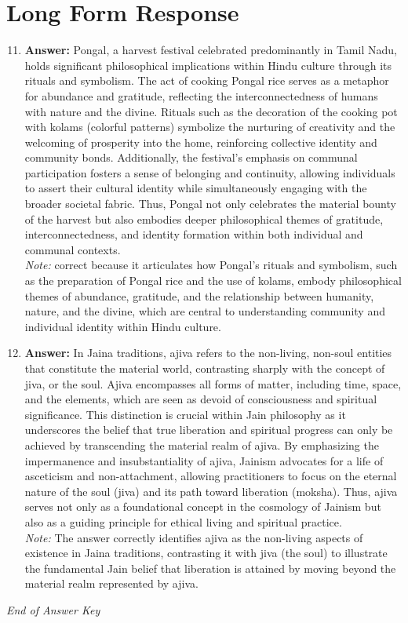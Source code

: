 \documentclass[12pt]{article}
\begin{document}
\section*{Long Form Response}
\begin{enumerate}[label=\arabic*.]
\setcounter{enumi}{10}
\item \textbf{Answer:} Pongal, a harvest festival celebrated predominantly in Tamil Nadu, holds significant philosophical implications within Hindu culture through its rituals and symbolism. The act of cooking Pongal rice serves as a metaphor for abundance and gratitude, reflecting the interconnectedness of humans with nature and the divine. Rituals such as the decoration of the cooking pot with kolams (colorful patterns) symbolize the nurturing of creativity and the welcoming of prosperity into the home, reinforcing collective identity and community bonds. Additionally, the festival's emphasis on communal participation fosters a sense of belonging and continuity, allowing individuals to assert their cultural identity while simultaneously engaging with the broader societal fabric. Thus, Pongal not only celebrates the material bounty of the harvest but also embodies deeper philosophical themes of gratitude, interconnectedness, and identity formation within both individual and communal contexts.
\\ \textit{Note:} correct because it articulates how Pongal's rituals and symbolism, such as the preparation of Pongal rice and the use of kolams, embody philosophical themes of abundance, gratitude, and the relationship between humanity, nature, and the divine, which are central to understanding community and individual identity within Hindu culture.
\item \textbf{Answer:} In Jaina traditions, ajiva refers to the non-living, non-soul entities that constitute the material world, contrasting sharply with the concept of jiva, or the soul. Ajiva encompasses all forms of matter, including time, space, and the elements, which are seen as devoid of consciousness and spiritual significance. This distinction is crucial within Jain philosophy as it underscores the belief that true liberation and spiritual progress can only be achieved by transcending the material realm of ajiva. By emphasizing the impermanence and insubstantiality of ajiva, Jainism advocates for a life of asceticism and non-attachment, allowing practitioners to focus on the eternal nature of the soul (jiva) and its path toward liberation (moksha). Thus, ajiva serves not only as a foundational concept in the cosmology of Jainism but also as a guiding principle for ethical living and spiritual practice.
\\ \textit{Note:} The answer correctly identifies ajiva as the non-living aspects of existence in Jaina traditions, contrasting it with jiva (the soul) to illustrate the fundamental Jain belief that liberation is attained by moving beyond the material realm represented by ajiva.
\end{enumerate}

\vfill
\noindent\textit{End of Answer Key}
\end{document}
